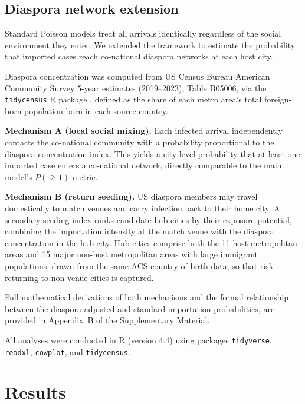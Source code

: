 \documentclass[12pt, a4paper]{article}
\begin{document}
\subsection{Diaspora network extension}

Standard Poisson models treat all arrivals identically regardless of the social environment they enter. We extended the framework to estimate the probability that imported cases reach co-national diaspora networks at each host city.

Diaspora concentration was computed from US Census Bureau American Community Survey 5-year estimates (2019--2023), Table B05006, via the \texttt{tidycensus} R package \citep{tidycensus,Census2026WC}, defined as the share of each metro area's total foreign-born population born in each source country.

\textbf{Mechanism A (local social mixing).} Each infected arrival independently contacts the co-national community with a probability proportional to the diaspora concentration index. This yields a city-level probability that at least one imported case enters a co-national network, directly comparable to the main model's $P(\geq 1)$ metric.

\textbf{Mechanism B (return seeding).} US diaspora members may travel domestically to match venues and carry infection back to their home city. A secondary seeding index ranks candidate hub cities by their exposure potential, combining the importation intensity at the match venue with the diaspora concentration in the hub city. Hub cities comprise both the 11 host metropolitan areas and 15 major non-host metropolitan areas with large immigrant populations, drawn from the same ACS country-of-birth data, so that risk returning to non-venue cities is captured.

Full mathematical derivations of both mechanisms and the formal relationship between the diaspora-adjusted and standard importation probabilities, are provided in Appendix~B of the Supplementary Material.

All analyses were conducted in R (version 4.4) using packages \texttt{tidyverse}, \texttt{readxl}, \texttt{cowplot}, and \texttt{tidycensus}.

\section{Results}
\end{document}
